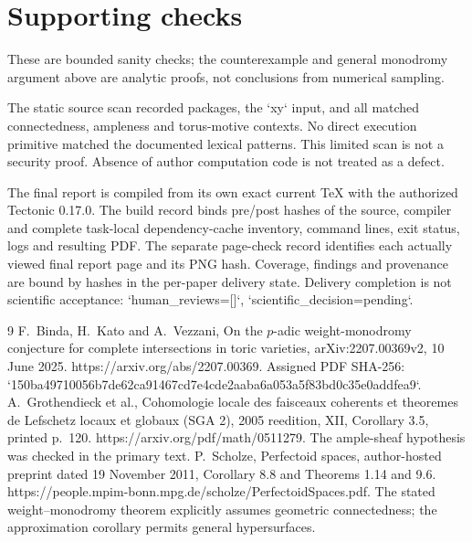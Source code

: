 \documentclass[10pt]{article}
\begin{document}
\section*{Supporting checks}
These are bounded sanity checks; the counterexample and general monodromy argument above are analytic proofs, not conclusions from numerical sampling.\par
The static source scan recorded packages, the `xy` input, and all matched connectedness, ampleness and torus-motive contexts. No direct execution primitive matched the documented lexical patterns. This limited scan is not a security proof. Absence of author computation code is not treated as a defect.\par
The final report is compiled from its own exact current TeX with the authorized Tectonic 0.17.0. The build record binds pre/post hashes of the source, compiler and complete task-local dependency-cache inventory, command lines, exit status, logs and resulting PDF. The separate page-check record identifies each actually viewed final report page and its PNG hash. Coverage, findings and provenance are bound by hashes in the per-paper delivery state. Delivery completion is not scientific acceptance: `human\_reviews=[]`, `scientific\_decision=pending`.\par
9 F. Binda, H. Kato and A. Vezzani, On the \(p\)-adic weight-monodromy conjecture for complete intersections in toric varieties, arXiv:2207.00369v2, 10 June 2025. https://arxiv.org/abs/2207.00369. Assigned PDF SHA-256: `150ba49710056b7de62ca91467cd7e4cde2aaba6a053a5f83bd0c35e0addfea9`. A. Grothendieck et al., Cohomologie locale des faisceaux coherents et theoremes de Lefschetz locaux et globaux (SGA 2), 2005 reedition, XII, Corollary 3.5, printed p. 120. https://arxiv.org/pdf/math/0511279. The ample-sheaf hypothesis was checked in the primary text. P. Scholze, Perfectoid spaces, author-hosted preprint dated 19 November 2011, Corollary 8.8 and Theorems 1.14 and 9.6. https://people.mpim-bonn.mpg.de/scholze/PerfectoidSpaces.pdf. The stated weight–monodromy theorem explicitly assumes geometric connectedness; the approximation corollary permits general hypersurfaces.\par
\end{document}
